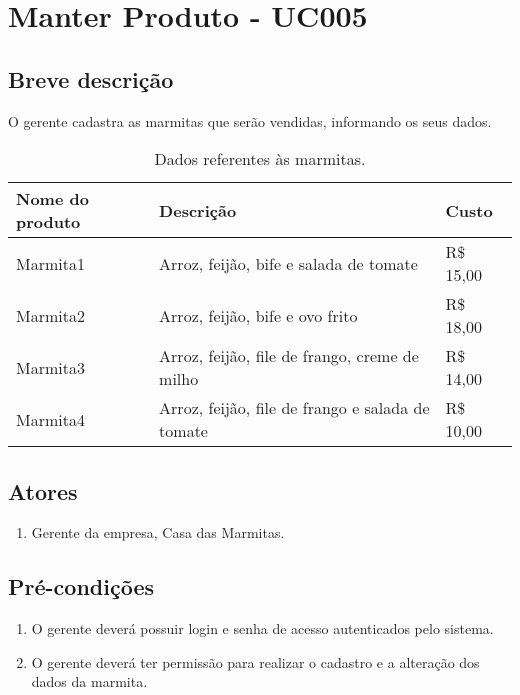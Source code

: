 \chapter{Manter Produto - UC005} \label{uc005}

\section{Breve descrição}

O gerente cadastra as marmitas que serão vendidas, informando os seus dados.

\begin{table}[htb]
	\ABNTEXfontereduzida
	\caption[Dados referentes às marmitas]{Dados referentes às marmitas.}
	\centering
	\label{tab-marmitas}
	\begin{tabular}{|p{4cm}|p{8cm}|p{2cm}|}
		\hline
		\textbf{Nome do produto} & \textbf{Descrição}                               & \textbf{Custo} \\ \hline
		Marmita1                 & Arroz, feijão, bife e salada de tomate           & R\$ 15,00      \\ \hline
		Marmita2                 & Arroz, feijão, bife e ovo frito                  & R\$ 18,00      \\ \hline
		Marmita3                 & Arroz, feijão, file de frango, creme de milho    & R\$ 14,00      \\ \hline
		Marmita4                 & Arroz, feijão, file de frango e salada de tomate & R\$ 10,00      \\ \hline
	\end{tabular}
\end{table}

\section{Atores}

\begin{enumerate}
	\item Gerente da empresa, Casa das Marmitas.
\end{enumerate}

\section{Pré-condições}

\begin{enumerate}
	\item O gerente deverá possuir login e senha de acesso autenticados pelo sistema.
	\item O gerente deverá ter permissão para realizar o cadastro e a alteração dos dados da marmita.
\end{enumerate}

